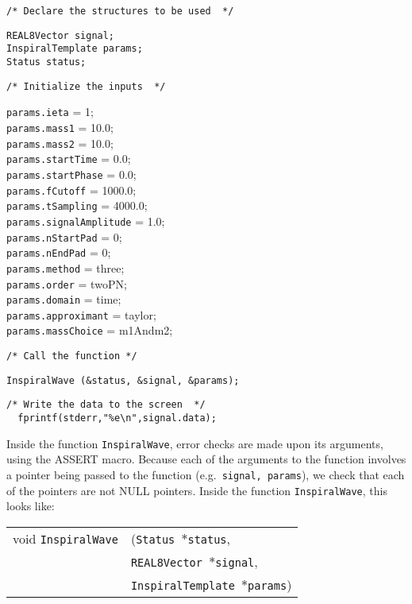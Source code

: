 \documentclass[12pt]{article}
\begin{document}
\noindent
\begin{verbatim}
/* Declare the structures to be used  */
\end{verbatim}
\texttt{REAL8Vector signal;} \\
\texttt{InspiralTemplate params;} \\
\texttt{Status status;} \\
\begin{verbatim}
/* Initialize the inputs  */
\end{verbatim}
\texttt{params.ieta} = 1; \\
\texttt{params.mass1} = 10.0; \\
\texttt{params.mass2} = 10.0; \\
\texttt{params.startTime} = 0.0; \\
\texttt{params.startPhase} = 0.0; \\
\texttt{params.fCutoff} = 1000.0; \\
\texttt{params.tSampling} = 4000.0; \\
\texttt{params.signalAmplitude} = 1.0; \\
\texttt{params.nStartPad} = 0; \\
\texttt{params.nEndPad} = 0; \\
\texttt{params.method} = three; \\
\texttt{params.order} = twoPN; \\
\texttt{params.domain} = time; \\
\texttt{params.approximant} = taylor; \\
\texttt{params.massChoice} = m1Andm2; \\
\begin{verbatim}
/* Call the function */
\end{verbatim}
\texttt{InspiralWave (\&status, \&signal, \&params);}
\begin{verbatim}
/* Write the data to the screen  */
  fprintf(stderr,"%e\n",signal.data); 
\end{verbatim}

Inside the function \texttt{InspiralWave}, error checks are made upon its arguments, using the ASSERT macro. Because each of the arguments to the function involves a pointer being passed to the function (e.g.\ \texttt{signal, params}), we check that each of the pointers are not NULL pointers.
Inside the function \texttt{InspiralWave}, this looks like:

\vspace{5mm}

\begin{tabular}{ll}
void \texttt{InspiralWave}&(\texttt{Status $\ast$status},     \\
                                   &\texttt{REAL8Vector $\ast$signal}, \\
                                   &\texttt{InspiralTemplate $\ast$params})
\end{tabular}
\end{document}

